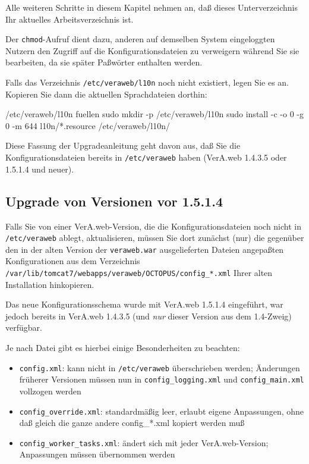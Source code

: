 Alle weiteren Schritte in diesem Kapitel nehmen an, daß dieses
Unterverzeichnis Ihr aktuelles Arbeitsverzeichnis ist.

Der \texttt{chmod}-Aufruf dient dazu, anderen auf demselben System
eingeloggten Nutzern den Zugriff auf die Konfigurationsdateien zu
verweigern während Sie sie bearbeiten, da sie später Paßwörter
enthalten werden.

\begin{minipage}{\textwidth}
Falls das Verzeichnis \texttt{/etc/veraweb/l10n} noch nicht existiert,
legen Sie es an. Kopieren Sie dann die aktuellen Sprachdateien dorthin:

\begin{lstdump}{/etc/veraweb/l10n fuellen}
sudo mkdir -p /etc/veraweb/l10n
sudo install -c -o 0 -g 0 -m 644 l10n/*.resource /etc/veraweb/l10n/
\end{lstdump}
\end{minipage}

\ifvwconfigsinetcalready
Diese Fassung der Upgradeanleitung geht davon aus, daß Sie die
Konfigurationsdateien bereits in \texttt{/etc/veraweb} haben
(VerA.web 1.4.3.5 oder 1.5.1.4 und neuer).
\else%

\subsection{Upgrade von Versionen vor 1.5.1.4}\label{subsec:upgrade-1514}

Falls Sie von einer VerA.web-Version, die die Konfigurationsdateien noch
nicht in \texttt{/etc/veraweb} ablegt, aktualisieren, müssen Sie dort
zunächst (nur) die gegenüber den in der alten Version der \texttt{veraweb.war}
ausgelieferten Dateien angepaßten Konfigurationen aus dem Verzeichnis
\texttt{/var/lib/tomcat7/webapps/veraweb/OCTOPUS/config\_*.xml}
Ihrer alten Installation hinkopieren.

Das neue Konfigurationsschema wurde mit VerA.web 1.5.1.4 eingeführt,
war jedoch bereits in VerA.web 1.4.3.5 (und \emph{nur} dieser Version
aus dem 1.4-Zweig) verfügbar.

Je nach Datei gibt es hierbei einige Besonderheiten zu beachten:\keinumbruch

\begin{itemize}
 \item{\texttt{config.xml}: kann nicht in \texttt{/etc/veraweb}
  überschrieben werden; Änderungen früherer Versionen müssen nun
  in \texttt{config\_logging.xml} und \texttt{config\_main.xml}
  vollzogen werden}
 \item{\texttt{config\_override.xml}: standardmäßig leer, erlaubt
  eigene Anpassungen, ohne daß gleich die ganze andere config\_*.xml
  kopiert werden muß}
 \item{\texttt{config\_worker\_tasks.xml}: ändert sich mit jeder
  VerA.web-Version; Anpassungen müssen übernommen werden}
\end{itemize}

